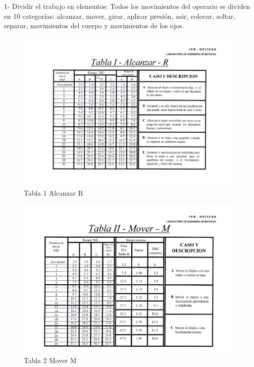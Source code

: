    1- Dividir el trabajo en elementos: Todos los movimientos del operario se dividen en 10 categorías: alcanzar, mover, girar, aplicar presión, asir, colocar, soltar, separar, movimientos del cuerpo y movimientos de los ojos. \cite{ronquillo2021analisis}
    \begin{figure}[H]
            \centering
            \includegraphics[trim = {1mm 1mm 1mm 26mm},clip,scale=0.3]{34/img/tablaAlcanzarR.pdf}
            \caption{Tabla 1 Alcanzar R}
            \label{fig:tablaAlcanzarR}
        \end{figure}
    
    \begin{figure}[H]
            \centering
            \includegraphics[trim = {1mm 1mm 1mm 26mm},clip,scale=0.3]{34/img/tablaMoverM.pdf}
            \caption{Tabla 2 Mover M}
            \label{fig:tablaMoverM}
        \end{figure}
    
